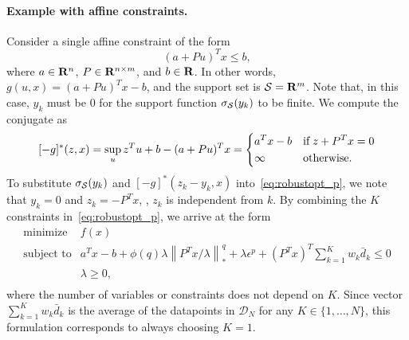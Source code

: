 \documentclass[12pt]{article}
\theoremstyle{thmstyleone}%
\theoremstyle{thmstyletwo}%
\theoremstyle{thmstylethree}%
\begin{document}
\paragraph{Example with affine constraints.}
Consider a single affine constraint of the form
\begin{equation}
	\label{eq:affineg}
	(a + Pu)^Tx \le b,
\end{equation}
where $a \in {\mathbf R}^n$, $P \in {\mathbf R}^{n \times m}$, and $b \in {\mathbf R}$.
In other words, $g(u, x) = (a + Pu)^Tx - b$, and the support set is $\mathcal{S} = {\mathbf R}^m$.
Note that, in this case, $y_k$ must be $0$ for the support function $\sigma_{\mathcal{S}}(y_k)$ to be finite.
We compute the conjugate as
\begin{equation}
\label{eq:conj_affine}
[-g]^*(z, x) =  \sup_u z^Tu +b - (a + Pu)^Tx =
\begin{dcases} a^Tx - b & \text{if}\; z + P^Tx = 0\\
	\infty & \text{otherwise}.
\end{dcases}
\end{equation}
To substitute $\sigma_{\mathcal{S}}(y_k)$ and $[-g]^*(z_k - y_k, x)$ into~\eqref{eq:robustopt_p}, we note that $y_k = 0$ and $z_k = -P^Tx$, \ie, $z_k$ is independent from $k$.
By combining the $K$ constraints in~\eqref{eq:robustopt_p}, we arrive at the form
\begin{equation}
	\label{eq:example-affine-p}
	\begin{array}{ll}
		\mbox{minimize} & f(x)\\
		\mbox{subject to} & a^Tx - b + \phi(q)\lambda \left\|P^Tx/\lambda \right\|^q_*  +\lambda \epsilon^p + (P^Tx)^T\sum_{k=1}^{K} w_k \bar{d}_k \le 0\\
		& \lambda \ge 0,\\
	\end{array}
\end{equation}
where the number of variables or constraints does not depend on $K$.
Since vector $\sum_{k=1}^{K} w_k \bar{d}_k$ is the average of the datapoints in $\mathcal{D}_N$ for any $K \in \{1,\dots,N\}$, this formulation corresponds to always choosing $K=1$.
\end{document}
